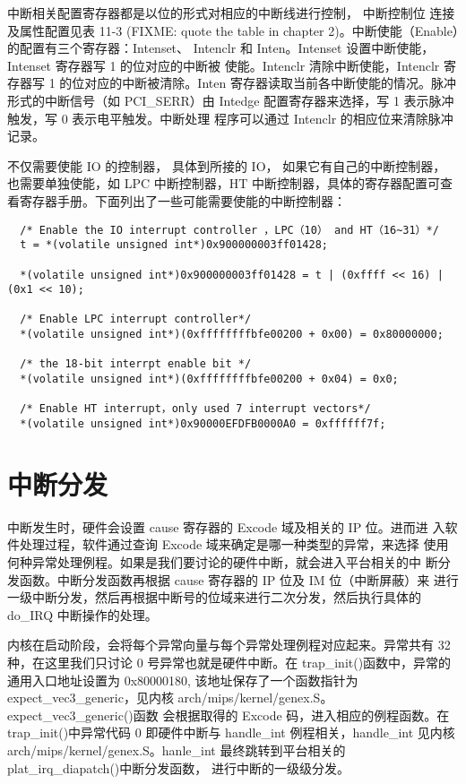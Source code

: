 中断相关配置寄存器都是以位的形式对相应的中断线进行控制， 中断控制位
连接及属性配置见表 11-3 (FIXME: quote the table in chapter
2)。中断使能（Enable）的配置有三个寄存器：Intenset、 Intenclr 和
Inten。Intenset 设置中断使能，Intenset 寄存器写 1 的位对应的中断被
使能。Intenclr 清除中断使能，Intenclr 寄存器写 1 的位对应的中断被清除。Inten
寄存器读取当前各中断使能的情况。脉冲形式的中断信号（如 PCI\_SERR）由 Intedge
配置寄存器来选择，写 1 表示脉冲触发，写 0 表示电平触发。中断处理 程序可以通过
Intenclr 的相应位来清除脉冲记录。

不仅需要使能 IO 的控制器， 具体到所接的 IO， 如果它有自己的中断控制器，
也需要单独使能，如 LPC 中断控制器，HT 中断控制器，具体的寄存器配置可查
看寄存器手册。下面列出了一些可能需要使能的中断控制器：

\begin{lstlisting}
  /* Enable the IO interrupt controller ，LPC（10） and HT（16~31）*/
  t = *(volatile unsigned int*)0x900000003ff01428;

  *(volatile unsigned int*)0x900000003ff01428 = t | (0xffff << 16) | (0x1 << 10);

  /* Enable LPC interrupt controller*/
  *(volatile unsigned int*)(0xffffffffbfe00200 + 0x00) = 0x80000000;

  /* the 18-bit interrpt enable bit */
  *(volatile unsigned int*)(0xffffffffbfe00200 + 0x04) = 0x0;

  /* Enable HT interrupt，only used 7 interrupt vectors*/
  *(volatile unsigned int*)0x90000EFDFB0000A0 = 0xffffff7f;
\end{lstlisting}

\section{中断分发}

中断发生时，硬件会设置 cause 寄存器的 Excode 域及相关的 IP 位。进而进
入软件处理过程，软件通过查询 Excode 域来确定是哪一种类型的异常，来选择
使用何种异常处理例程。如果是我们要讨论的硬件中断，就会进入平台相关的中
断分发函数。中断分发函数再根据 cause 寄存器的 IP 位及 IM 位（中断屏蔽）来
进行一级中断分发，然后再根据中断号的位域来进行二次分发，然后执行具体的 do\_IRQ
中断操作的处理。

内核在启动阶段，会将每个异常向量与每个异常处理例程对应起来。异常共有
32 种，在这里我们只讨论 0 号异常也就是硬件中断。在
trap\_init()函数中，异常的通用入口地址设置为 0x80000180,
该地址保存了一个函数指针为 expect\_vec3\_generic，见内核
arch/mips/kernel/genex.S。expect\_vec3\_generic()函数 会根据取得的 Excode
码，进入相应的例程函数。在 trap\_init()中异常代码 0 即硬件中断与 handle\_int
例程相关，handle\_int 见内核 arch/mips/kernel/genex.S。hanle\_int
最终跳转到平台相关的 plat\_irq\_diapatch()中断分发函数，
进行中断的一级级分发。

